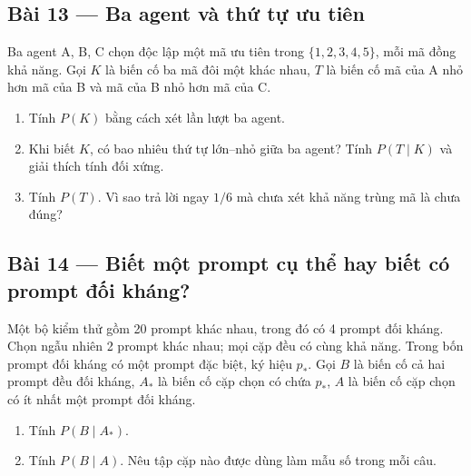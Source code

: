 \documentclass[11pt,a4paper]{article}
\begin{document}
\par\medskip

\noindent\begin{minipage}{\linewidth}
\subsection*{Bài 13 --- Ba agent và thứ tự ưu tiên}

Ba agent A, B, C chọn độc lập một mã ưu tiên trong \(\{1,2,3,4,5\}\), mỗi mã đồng khả năng. Gọi \(K\) là biến cố ba mã đôi một khác nhau, \(T\) là biến cố mã của A nhỏ hơn mã của B và mã của B nhỏ hơn mã của C.

\begin{enumerate}[label=\alph*)]
\item Tính \(P(K)\) bằng cách xét lần lượt ba agent.
\item Khi biết \(K\), có bao nhiêu thứ tự lớn--nhỏ giữa ba agent? Tính \(P(T\mid K)\) và giải thích tính đối xứng.
\item Tính \(P(T)\). Vì sao trả lời ngay \(1/6\) mà chưa xét khả năng trùng mã là chưa đúng?
\end{enumerate}

\end{minipage}\par

\par\medskip

\noindent\begin{minipage}{\linewidth}
\subsection*{Bài 14 --- Biết một prompt cụ thể hay biết có prompt đối kháng?}

Một bộ kiểm thử gồm 20 prompt khác nhau, trong đó có 4 prompt đối kháng. Chọn ngẫu nhiên 2 prompt khác nhau; mọi cặp đều có cùng khả năng. Trong bốn prompt đối kháng có một prompt đặc biệt, ký hiệu \(p_*\). Gọi \(B\) là biến cố cả hai prompt đều đối kháng, \(A_*\) là biến cố cặp chọn có chứa \(p_*\), \(A\) là biến cố cặp chọn có ít nhất một prompt đối kháng.

\begin{enumerate}[label=\alph*)]
\item Tính \(P(B\mid A_*)\).
\item Tính \(P(B\mid A)\). Nêu tập cặp nào được dùng làm mẫu số trong mỗi câu.
\end{enumerate}

\end{minipage}\par
\end{document}

